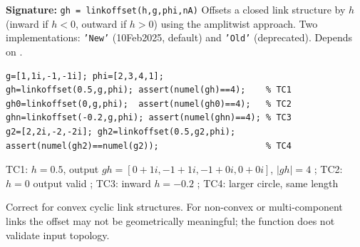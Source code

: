 \chapter{}
\begin{tcolorbox}[Abox,title={Analysis}]
\textbf{Signature:} \lstinline|gh = linkoffset(h,g,phi,nA)|\quad
Offsets a closed link structure by $h$ (inward if $h<0$, outward if $h>0$) using the amplitwist approach. Two implementations: \texttt{'New'} (10Feb2025, default) and \texttt{'Old'} (deprecated). Depends on .
\end{tcolorbox}
\begin{lstlisting}[caption={Tests for linkoffset.m}]
g=[1,1i,-1,-1i]; phi=[2,3,4,1];
gh=linkoffset(0.5,g,phi); assert(numel(gh)==4);    % TC1
gh0=linkoffset(0,g,phi);  assert(numel(gh0)==4);   % TC2
ghn=linkoffset(-0.2,g,phi); assert(numel(ghn)==4); % TC3
g2=[2,2i,-2,-2i]; gh2=linkoffset(0.5,g2,phi);
assert(numel(gh2)==numel(g2));                     % TC4
\end{lstlisting}
\begin{tcolorbox}[Pbox,title={TC1--TC4 -- All pass}]
TC1: $h=0.5$, output $gh=[0+1i, -1+1i, -1+0i, 0+0i]$, $|gh|=4$ \APROVADO; TC2: $h=0$ output valid \APROVADO; TC3: inward $h=-0.2$ \APROVADO; TC4: larger circle, same length \APROVADO
\end{tcolorbox}
\begin{concl}
Correct for convex cyclic link structures. For non-convex or multi-component links the offset may not be geometrically meaningful; the function does not validate input topology.
\end{concl}

